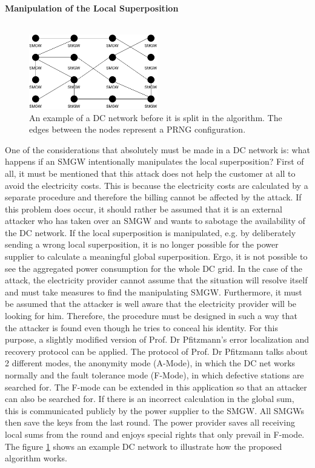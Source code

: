 \\ 
\textbf{Manipulation of the Local Superposition}
\\
\\
\begin{figure}[tbp]
  \centering
  \includegraphics[width=0.5\textwidth]{images/DC Net before Split.png}
  \caption[Example DC Network]{An example of a DC network before it is split in the algorithm. The edges between the nodes represent a PRNG configuration.}
  \label{fig:splitDCNetwork}
\end{figure}
One of the considerations that absolutely must be made in a DC network is: what happens if an SMGW intentionally manipulates the local superposition?
First of all, it must be mentioned that this attack does not help the customer at all to avoid the electricity costs. This is because the electricity costs are calculated by a separate procedure and therefore the billing cannot be affected by the attack. If this problem does occur, it should rather be assumed that it is an external attacker who has taken over an SMGW and wants to sabotage the availability of the DC network.
If the local superposition is manipulated, e.g. by deliberately sending a wrong local superposition, it is no longer possible for the power supplier to calculate a meaningful global superposition. Ergo, it is not possible to see the aggregated power consumption for the whole DC grid. In the case of the attack, the electricity provider cannot assume that the situation will resolve itself and must take measures to find the manipulating SMGW. Furthermore, it must be assumed that the attacker is well aware that the electricity provider will be looking for him. Therefore, the procedure must be designed in such a way that the attacker is found even though he tries to conceal his identity.
For this purpose, a slightly modified version of Prof. Dr Pfitzmann's error localization and recovery protocol can be applied. The protocol of Prof. Dr Pfitzmann talks about 2 different modes, the anonymity mode (A-Mode), in which the DC net works normally and the fault tolerance mode (F-Mode), in which defective stations are searched for.
The F-mode can be extended in this application so that an attacker can also be searched for. If there is an incorrect calculation in the global sum, this is communicated publicly by the power supplier to the SMGW. All SMGWs then save the keys from the last round. The power provider saves all receiving local sums from the round and enjoys special rights that only prevail in F-mode. The figure \ref{fig:splitDCNetwork} shows an example DC network to illustrate how the proposed algorithm works.
